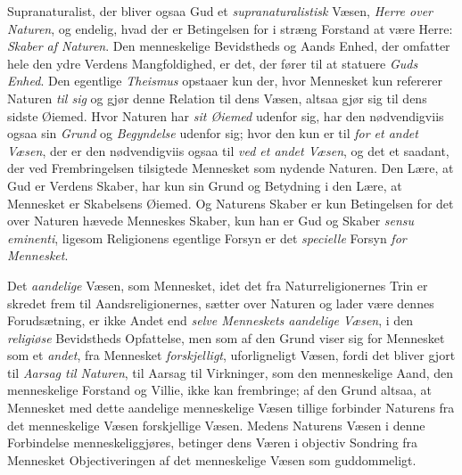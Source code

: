 Supranaturalist, der bliver ogsaa Gud et \emph{supranaturalistisk} Væsen,
\emph{Herre over Naturen}, og endelig, hvad der er
 Betingelsen for i stræng Forstand at være Herre: \emph{Skaber af Naturen}. Den
menneskelige Bevidstheds og Aands Enhed, der omfatter hele den ydre Verdens
Mangfoldighed, er det, der fører til at statuere \emph{Guds Enhed}. Den egentlige
\emph{Theismus} opstaaer kun der, hvor Mennesket kun refererer Naturen \emph{til sig}
og gjør denne Relation til dens Væsen, altsaa gjør sig til dens sidste Øiemed.
Hvor Naturen har \emph{sit Øiemed} udenfor sig, har den nødvendigviis ogsaa sin
\emph{Grund} og \emph{Begyndelse} udenfor sig; hvor den kun er til \emph{for et andet
Væsen}, der er den nødvendigviis ogsaa til \emph{ved et andet Væsen}, og det et
saadant, der ved Frembringelsen tilsigtede Mennesket som nydende Naturen. Den
Lære, at Gud er Verdens Skaber, har kun sin Grund og Betydning i den Lære, at
Mennesket er Skabelsens Øiemed. Og Naturens Skaber er kun Betingelsen for det
over Naturen hævede Menneskes Skaber, kun han er Gud og Skaber \textit{sensu
eminenti}, ligesom Religionens egentlige Forsyn er det \emph{specielle} Forsyn
\emph{for Mennesket}.

Det \emph{aandelige} Væsen, som Mennesket, idet det fra Naturreligionernes Trin er
skredet frem til Aandsreligionernes, sætter over Naturen og lader være dennes
Forudsætning, er ikke Andet end \emph{selve Menneskets aandelige Væsen}, i den
\emph{religiøse} Bevidstheds Opfattelse, men som af den Grund viser sig for
Mennesket som et \emph{andet}, fra Mennesket \emph{forskjelligt}, uforligneligt
Væsen, fordi det bliver gjort til \emph{Aarsag til Naturen}, til Aarsag til
Virkninger, som den menneskelige Aand, den menneskelige Forstand og Villie,
ikke kan frembringe; af den Grund altsaa, at Mennesket med dette aandelige
menneskelige Væsen tillige forbinder Naturens fra det menneskelige Væsen
forskjellige Væsen. Medens Naturens Væsen i denne Forbindelse
menneskeliggjøres, betinger dens Væren i objectiv Sondring fra Mennesket
Objectiveringen af det menneskelige Væsen som guddommeligt.

